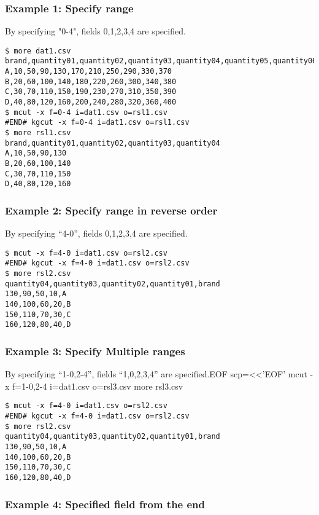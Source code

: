 \subsubsection*{Example 1: Specify range}

By specifying "0-4", fields 0,1,2,3,4 are specified.  


\begin{Verbatim}[baselinestretch=0.7,frame=single]
$ more dat1.csv
brand,quantity01,quantity02,quantity03,quantity04,quantity05,quantity06,quantity07,quantity08,quantity09,quantity10
A,10,50,90,130,170,210,250,290,330,370
B,20,60,100,140,180,220,260,300,340,380
C,30,70,110,150,190,230,270,310,350,390
D,40,80,120,160,200,240,280,320,360,400
$ mcut -x f=0-4 i=dat1.csv o=rsl1.csv
#END# kgcut -x f=0-4 i=dat1.csv o=rsl1.csv
$ more rsl1.csv
brand,quantity01,quantity02,quantity03,quantity04
A,10,50,90,130
B,20,60,100,140
C,30,70,110,150
D,40,80,120,160
\end{Verbatim}
\subsubsection*{Example 2: Specify range in reverse order}

By specifying “4-0”,  fields 0,1,2,3,4 are specified.


\begin{Verbatim}[baselinestretch=0.7,frame=single]
$ mcut -x f=4-0 i=dat1.csv o=rsl2.csv
#END# kgcut -x f=4-0 i=dat1.csv o=rsl2.csv
$ more rsl2.csv
quantity04,quantity03,quantity02,quantity01,brand
130,90,50,10,A
140,100,60,20,B
150,110,70,30,C
160,120,80,40,D
\end{Verbatim}
\subsubsection*{Example 3: Specify Multiple ranges}

By specifying “1-0,2-4”, fields “1,0,2,3,4” are specified.EOF
scp=<<'EOF'
mcut -x f=1-0,2-4 i=dat1.csv o=rsl3.csv
more rsl3.csv


\begin{Verbatim}[baselinestretch=0.7,frame=single]
$ mcut -x f=4-0 i=dat1.csv o=rsl2.csv
#END# kgcut -x f=4-0 i=dat1.csv o=rsl2.csv
$ more rsl2.csv
quantity04,quantity03,quantity02,quantity01,brand
130,90,50,10,A
140,100,60,20,B
150,110,70,30,C
160,120,80,40,D
\end{Verbatim}
\subsubsection*{Example 4: Specified field from the end}


